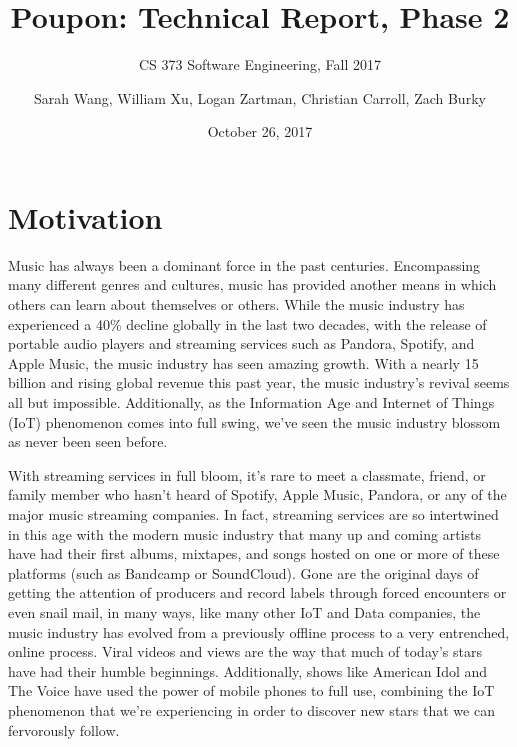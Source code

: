 \documentclass{scrartcl}
\title{Poupon: Technical Report, Phase 2}
\subtitle{CS 373 Software Engineering, Fall 2017}
\author{Sarah Wang, William Xu, Logan Zartman, Christian Carroll, Zach Burky}
\date{October 26, 2017}
\begin{document}
    \maketitle

    \tableofcontents

    \newpage
    \section{Motivation}\label{sec:motivation}
    \indent
    Music has always been a dominant force in the past centuries.
    Encompassing many different genres and cultures, music has provided another means in which others can learn about themselves or others.
    While the music industry has experienced a 40\% decline globally in the last two decades, with the release of portable audio players and streaming services such as Pandora, Spotify, and Apple Music, the music industry has seen amazing growth.
    With a nearly 15 billion and rising global revenue this past year, the music industry's revival seems all but impossible.
    Additionally, as the Information Age and Internet of Things (IoT) phenomenon comes into full swing, we've seen the music industry blossom as never been seen before.

    With streaming services in full bloom, it's rare to meet a classmate, friend, or family member who hasn't heard of Spotify, Apple Music, Pandora, or any of the major music streaming companies.
    In fact, streaming services are so intertwined in this age with the modern music industry that many up and coming artists have had their first albums, mixtapes, and songs hosted on one or more of these platforms (such as Bandcamp or SoundCloud).
    Gone are the original days of getting the attention of producers and record labels through forced encounters or even snail mail, in many ways, like many other IoT and Data companies, the music industry has evolved from a previously offline process to a very entrenched, online process.
    Viral videos and views are the way that much of today's stars have had their humble beginnings.
    Additionally, shows like American Idol and The Voice have used the power of mobile phones to full use, combining the IoT phenomenon that we're experiencing in order to discover new stars that we can fervorously follow.
\end{document}
